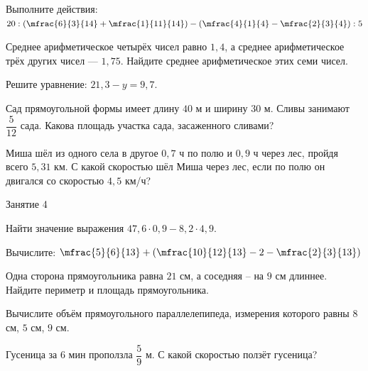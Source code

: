 \begin{class}[number=3]
\begin{listofex}
		\item Выполните действия: \( 20 : \left( \mfrac{6}{3}{14}+\mfrac{1}{11}{14}  \right) - \left( \mfrac{4}{1}{4}-\mfrac{2}{3}{4} \right):5\)
		\item Среднее арифметическое четырёх чисел равно \( 1,4 \), а среднее арифметическое трёх других
		чисел --- \( 1,75 \). Найдите среднее арифметическое этих семи чисел.
		\item Решите уравнение: \( 21,3 - y = 9,7 \).
		\item Сад прямоугольной формы имеет длину \( 40 \) м и ширину \( 30 \) м. Сливы занимают \( \dfrac{5}{12} \) сада. Какова площадь участка сада, засаженного сливами?
		\item Миша шёл из одного села в другое \( 0,7 \) ч по полю и \( 0,9 \) ч через лес, пройдя всего \( 5,31 \) км. С какой скоростью шёл Миша через лес, если по полю он двигался со скоростью \( 4,5 \) км/ч?
	\end{listofex}
\end{class}

\begin{class}[number=4]
	\begin{listofex}
		\item Занятие 4
	\end{listofex}
\end{class}

\begin{homework}[number=2]
	\begin{listofex}
		\item Найти значение выражения \( 47,6\cdot 0,9 - 8,2\cdot 4,9 \).
		\item Вычислите: \( \mfrac{5}{6}{13}+\left( \mfrac{10}{12}{13}-2-\mfrac{2}{3}{13} \right) \)
		\item Одна сторона прямоугольника равна \( 21 \) см, а соседняя – на \(  9 \) см длиннее. Найдите периметр и площадь прямоугольника.
		\item Вычислите объём прямоугольного параллелепипеда, измерения которого равны \( 8 \) см, \( 5 \) см, \( 9 \) см.
		\item Гусеница за \( 6 \) мин проползла \( \dfrac{5}{9} \) м. С какой скоростью ползёт гусеница?
	\end{listofex}
\end{homework}

